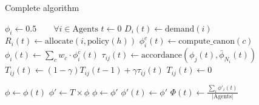 \documentclass[conference,compsoc]{IEEEtran}
\begin{document}
\begin{algorithm}
\caption{Complete algorithm}
\begin{algorithmic}[1]
\STATE $\phi_i \leftarrow 0.5 \qquad \forall i \in \text{Agents}$
\STATE $t \leftarrow 0$
\REPEAT
    \STATE {}
        \STATE $D_i(t) \leftarrow \text{demand}(i)$ 
        \STATE $R_i(t) \leftarrow \text{allocate}(i, \text{policy}(h))$ 
    \ENDFOR
    \STATE {}
    \STATE {}
            \STATE $\phi_{i}^{c}(t) \leftarrow \text{compute\_canon}(c)$
        \ENDFOR
        \STATE $\phi_i(t) \leftarrow \sum_c w_c \cdot \phi_{i}^{c}(t)$
    \ENDFOR
    \STATE {}
                \STATE $\tau_{ij}(t) \leftarrow \text{accordance}(\phi_j(t), \bar\phi_{N_i}(t))$
                \STATE $T_{ij}(t) \leftarrow (1-\gamma) T_{ij}(t-1) + \gamma \tau_{ij}(t) $
            \ELSE 
                \STATE $T_{ij}(t) \leftarrow 0 $
            \ENDIF
        \ENDFOR
    \ENDFOR
    
    
    \STATE {}
    \STATE $\phi \leftarrow \phi(t)$
        \STATE $\phi' \leftarrow T \times \phi$
        \STATE $\phi \leftarrow \phi'$
    \ENDFOR
    \STATE $\phi'(t) \leftarrow \phi'$
    \STATE {}
    \STATE $\Phi(t) \leftarrow \frac{\sum_i \phi'_i(t)}{|\text{Agents}|}$


\end{algorithmic}
\end{algorithm}


\end{document}
